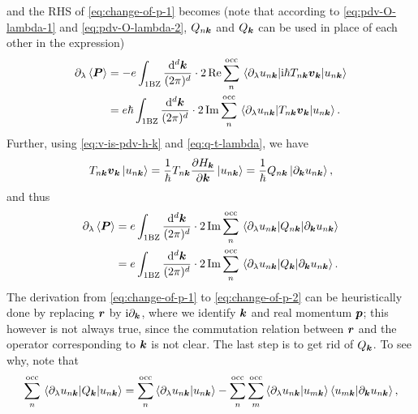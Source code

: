 \documentclass[hyperref, a4paper]{article}
\newcommand*{\ii}{\mathrm{i}}
\begin{document}
and the RHS of \eqref{eq:change-of-p-1} becomes 
(note that according to \eqref{eq:pdv-O-lambda-1} and \eqref{eq:pdv-O-lambda-2},
$Q_{n \vb*{k}}$ and $Q_{\vb*{k}}$ 
can be used in place of each other in the expression)
\begin{equation}
    \begin{aligned}
        \partial_\lambda \expval{\vb*{P}}
        &= - e \int_{\text{1BZ}} \frac{\dd[d]{\vb*{k}}}{(2\pi)^d} 
        \cdot 2 \Re \sum_{n}^{\text{occ}} 
        \mel{\partial_\lambda u_{n \vb*{k}}}{\ii \hbar T_{n \vb*{k}} \vb*{v}_{\vb*{k}}}{u_{n \vb*{k}}} \\
        &= e \hbar \int_{\text{1BZ}} \frac{\dd[d]{\vb*{k}}}{(2\pi)^d} 
        \cdot 2 \Im \sum_{n}^{\text{occ}} 
        \mel{\partial_\lambda u_{n \vb*{k}}}{T_{n \vb*{k}} \vb*{v}_{\vb*{k}}}{u_{n \vb*{k}}}.
    \end{aligned}
\end{equation}
Further, using \eqref{eq:v-is-pdv-h-k} and \eqref{eq:q-t-lambda}, we have 
\[
    T_{n \vb*{k}} \vb*{v}_{\vb*{k}} \ket*{u_{n \vb*{k}}}
    = \frac{1}{\hbar} T_{n \vb*{k}} \pdv{H_{\vb*{k}}}{\vb*{k}} \ket*{u_{n \vb*{k}}}
    = \frac{1}{\hbar} Q_{n \vb*{k}} \ket*{\partial_{\vb*{k}} u_{n \vb*{k}}},
\]
and thus 
\begin{equation}
    \begin{aligned}
        \partial_{\lambda} \expval{\vb*{P}}
        &= e \int_{\text{1BZ}} \frac{\dd[d]{\vb*{k}}}{(2\pi)^d} 
        \cdot 2 \Im \sum_{n}^{\text{occ}} 
        \mel{\partial_\lambda u_{n \vb*{k}}}{Q_{n \vb*{k}}}{\partial_{\vb*{k}} u_{n \vb*{k}}} \\
        &= e \int_{\text{1BZ}} \frac{\dd[d]{\vb*{k}}}{(2\pi)^d} 
        \cdot 2 \Im \sum_{n}^{\text{occ}} 
        \mel{\partial_\lambda u_{n \vb*{k}}}{Q_{\vb*{k}}}{\partial_{\vb*{k}} u_{n \vb*{k}}}.
    \end{aligned}
    \label{eq:change-of-p-2}
\end{equation}
The derivation from \eqref{eq:change-of-p-1} to \eqref{eq:change-of-p-2}
can be heuristically done by replacing $\vb*{r}$ by $\ii \partial_{\vb*{k}}$,
where we identify $\vb*{k}$ and real momentum $\vb*{p}$;
this however is not always true, 
since the commutation relation between $\vb*{r}$ and 
the operator corresponding to $\vb*{k}$ is not clear.
The last step is to get rid of $Q_{\vb*{k}}$.
To see why, note that 
\[
    \sum_{n}^{\text{occ}} \mel{\partial_\lambda u_{n \vb*{k}}}{Q_{\vb*{k}}}{u_{n \vb*{k}}}
    = \sum_{n}^{\text{occ}} \braket{\partial_\lambda u_{n \vb*{k}}}{u_{n \vb*{k}}}
    - \sum_{n}^{\text{occ}} \sum_{m}^{\text{occ}}
    \braket{\partial_{\lambda} u_{n \vb*{k}}}{u_{m \vb*{k}}}
    \braket{u_{m \vb*{k}}}{\partial_{\vb*{k}} u_{n \vb*{k}}},
\]
\end{document}
